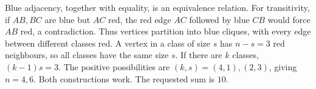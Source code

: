 Blue adjacency, together with equality, is an equivalence relation. For transitivity, if $AB,BC$ are blue but $AC$ red, the red edge $AC$ followed by blue $CB$ would force $AB$ red, a contradiction. Thus vertices partition into blue cliques, with every edge between different classes red. A vertex in a class of size $s$ has $n-s=3$ red neighbours, so all classes have the same size $s$. If there are $k$ classes, $(k-1)s=3$. The positive possibilities are $(k,s)=(4,1),(2,3)$, giving $n=4,6$. Both constructions work. The requested sum is $\boxed{10}$.
